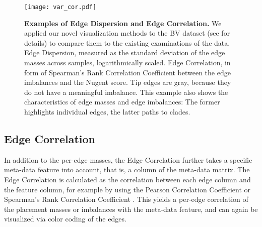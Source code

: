 \begin{figure}[!ht]
    \centering
    \texttt{[image: var\_cor.pdf]}
    \begin{subfigure}{0pt}
        \label{fig:var_cor:sub:em_varl}
    \end{subfigure}
    \begin{subfigure}{0pt}
        \label{fig:var_cor:sub:ei_var}
    \end{subfigure}
    \caption[Examples of Edge Dispersion and Edge Correlation]{
        \textbf{Examples of Edge Dispersion and Edge Correlation.}
        We applied our novel visualization methods to the \acf{BV} dataset
        (see  for details)
        to compare them to the existing examinations of the data.
        Edge Dispersion, measured as the standard deviation of the edge masses across samples, logarithmically scaled.
        Edge Correlation, in form of Spearman's Rank Correlation Coefficient
        between the edge imbalances and the Nugent score.
        Tip edges are gray, because they do not have a meaningful imbalance.
        This example also shows the characteristics of edge masses and edge imbalances:
        The former highlights individual edges, the latter paths to clades.
    }
    \label{fig:var_cor}
\end{figure}


\subsection{Edge Correlation}
\label{ch:Visualization:sec:Methods:sub:EdgeCorrelation}

In addition to the per-edge masses, the Edge Correlation further
takes a specific meta-data feature into account, that is, a column of the meta-data matrix.
The Edge Correlation is calculated as the correlation between each edge column and the feature column,
for example by using the Pearson Correlation Coefficient or Spearman's Rank Correlation Coefficient \cite{Everitt2010}.
This yields a per-edge correlation of the placement masses or imbalances with the meta-data feature,
and can again be visualized via color coding of the edges.

